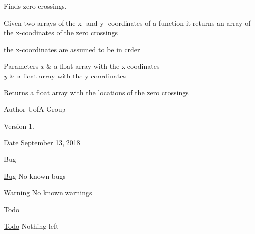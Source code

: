 Finds zero crossings. 

Given two arrays of the x-\/ and y-\/ coordinates of a function it returns an array of the x-\/coodinates of the zero crossings

the x-\/coordinates are assumed to be in order


\begin{DoxyParams}{Parameters}
{\em x} & a float array with the x-\/coodinates \\
\hline
{\em y} & a float array with the y-\/coordinates\\
\hline
\end{DoxyParams}
\begin{DoxyReturn}{Returns}
a float array with the locations of the zero crossings
\end{DoxyReturn}
\begin{DoxyAuthor}{Author}
UofA Group
\end{DoxyAuthor}
\begin{DoxyVersion}{Version}
1.
\end{DoxyVersion}
\begin{DoxyDate}{Date}
September 13, 2018
\end{DoxyDate}
\begin{DoxyRefDesc}{Bug}
\item[\mbox{\hyperlink{bug__bug000003}{Bug}}]No known bugs\end{DoxyRefDesc}


\begin{DoxyWarning}{Warning}
No known warnings
\end{DoxyWarning}
\begin{DoxyRefDesc}{Todo}
\item[\mbox{\hyperlink{todo__todo000003}{Todo}}]Nothing left \end{DoxyRefDesc}
